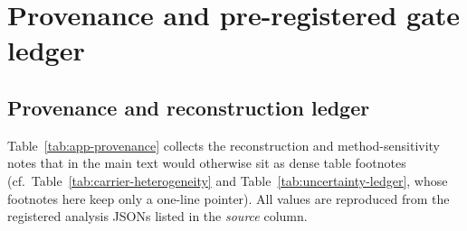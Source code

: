 
\appendix
\section{Provenance and pre-registered gate ledger}
\label{app:provenance}

\subsection{Provenance and reconstruction ledger}
\label{app:provenance-ledger}
Table~\ref{tab:app-provenance} collects the reconstruction and method-sensitivity notes that in
the main text would otherwise sit as dense table footnotes (cf.\
Table~\ref{tab:carrier-heterogeneity} and Table~\ref{tab:uncertainty-ledger}, whose footnotes
here keep only a one-line pointer). All values are reproduced from the registered analysis JSONs
listed in the \emph{source} column.

